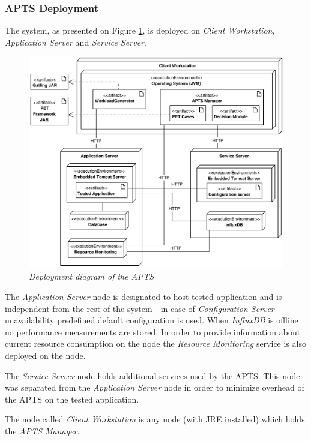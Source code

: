 \documentclass[12pt,a4paper]{article}
\begin{document}
\subsubsection{APTS Deployment} \label{section:aptsdeploy}

The system, as presented on Figure \ref{deploymentapts}, is deployed on \textit{Client Workstation}, \textit{Application Server} and \textit{Service Server}.

\begin{figure}[!htb]
\centering
\includegraphics[width=1\textwidth]{APTSDeploymentDiagram}
\caption{\textit{Deployment diagram of the APTS}}
\label{deploymentapts}
\end{figure}



The \textit{Application Server} node is designated to host tested application and is independent from the rest of the system - in case of \textit{Configuration Server} unavailability predefined default configuration is used. When \textit{InfluxDB} is offline no performance measurements are stored. In order to provide information about current resource consumption on the node the \textit{Resource Monitoring} service is also deployed on the node. 

The \textit{Service Server} node holds additional services used by the APTS. This node was separated from the \textit{Application Server} node in order to minimize overhead of the APTS on the tested application.

The node called \textit{Client Workstation} is any node (with JRE installed) which holds the \textit{APTS Manager}. 
\end{document}
